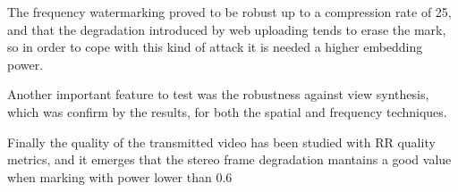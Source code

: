 The frequency watermarking proved to be robust up to a compression rate of 25, and that the degradation introduced by web uploading tends to erase the mark, so in order to cope with this kind of attack it is needed a higher embedding power.  

Another important feature to test was the robustness against view synthesis, which was confirm by the results, for both the spatial and frequency techniques.

Finally the quality of the transmitted video has been studied with RR quality metrics, and it emerges that the stereo frame degradation mantains a good value when marking with power lower than 0.6






